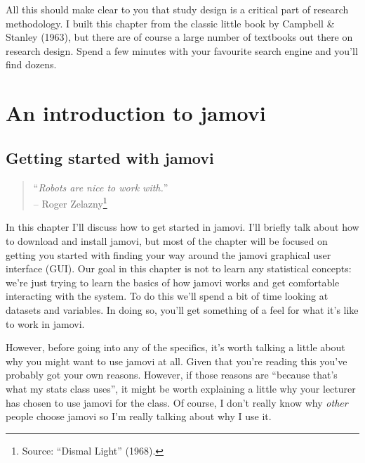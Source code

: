 \documentclass[
  a4paper,
]{book}
\begin{document}
All this should make clear to you that study design is a critical part
of research methodology. I built this chapter from the classic little
book by Campbell \& Stanley (1963), but there are of course a large
number of textbooks out there on research design. Spend a few minutes
with your favourite search engine and you'll find dozens.

\part{An introduction to jamovi}

\hypertarget{getting-started-with-jamovi}{%
\chapter{Getting started with
jamovi}\label{getting-started-with-jamovi}}

\begin{quote}
``\emph{Robots are nice to work with.}''\\
-- Roger Zelazny\footnote{Source: ``Dismal Light'' (1968).}
\end{quote}

In this chapter I'll discuss how to get started in jamovi. I'll briefly
talk about how to download and install jamovi, but most of the chapter
will be focused on getting you started with finding your way around the
jamovi graphical user interface (GUI). Our goal in this chapter is not
to learn any statistical concepts: we're just trying to learn the basics
of how jamovi works and get comfortable interacting with the system. To
do this we'll spend a bit of time looking at datasets and variables. In
doing so, you'll get something of a feel for what it's like to work in
jamovi.

However, before going into any of the specifics, it's worth talking a
little about why you might want to use jamovi at all. Given that you're
reading this you've probably got your own reasons. However, if those
reasons are ``because that's what my stats class uses'', it might be
worth explaining a little why your lecturer has chosen to use jamovi for
the class. Of course, I don't really know why \emph{other} people choose
jamovi so I'm really talking about why I use it.
\end{document}
